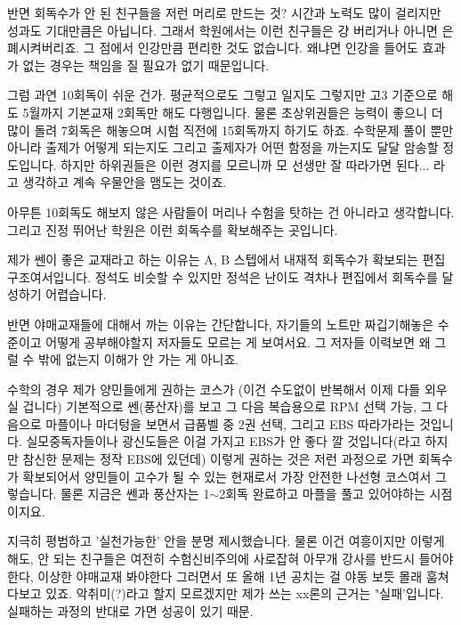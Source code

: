 반면 회독수가 안 된 친구들을 저런 머리로 만드는 것?
시간과 노력도 많이 걸리지만 성과도 기대만큼은 아닙니다. 그래서 학원에서는 이런 친구들은 걍 버리거나 아니면 은폐시켜버리죠.
그 점에서 인강만큼 편리한 것도 없습니다. 왜냐면 인강을 들어도 효과가 없는 경우는 책임을 질 필요가 없기 때문입니다.
\vspace{5mm}

그럼 과연 10회독이 쉬운 건가.
평균적으로도 그렇고 일지도 그렇지만 고3 기준으로 해도 5월까지 기본교재 2회독만 해도 다행입니다.
물론 초상위권들은 능력이 좋으니 더 많이 돌려 7회독은 해놓으며 시험 직전에 15회독까지 하기도 하죠.
수학문제 풀이 뿐만 아니라 출제가 어떻게 되는지도 그리고 출제자가 어떤 함정을 까는지도 달달 암송할 정도입니다.
하지만 하위권들은 이런 경지를 모르니까 모 선생만 잘 따라가면 된다... 라고 생각하고 계속 우물안을 맴도는 것이죠.
\vspace{5mm}

아무튼 10회독도 해보지 않은 사람들이 머리나 수험을 탓하는 건 아니라고 생각합니다.
그리고 진정 뛰어난 학원은 이런 회독수를 확보해주는 곳입니다.
\vspace{5mm}

제가 쎈이 좋은 교재라고 하는 이유는 A, B 스텝에서 내재적 회독수가 확보되는 편집구조여서입니다.
정석도 비슷할 수 있지만 정석은 난이도 격차나 편집에서 회독수를 달성하기 어렵습니다.
\vspace{5mm}

반면 야매교재들에 대해서 까는 이유는 간단합니다,
자기들의 노트만 짜깁기해놓은 수준이고 어떻게 공부해야할지 저자들도 모르는 게 보여서요.
그 저자들 이력보면 왜 그럴 수 밖에 없는지 이해가 안 가는 게 아니죠.
\vspace{5mm}

수학의 경우 제가 양민들에게 권하는 코스가 (이건 수도없이 반복해서 이제 다들 외우실 겁니다)
기본적으로 쎈(풍산자)를 보고 그 다음 복습용으로 RPM 선택 가능,
그 다음으로 마플이나 마더텅을 보면서 급품벨 중 2권 선택, 그리고 EBS 따라가라는 것입니다.
실모중독자들이나 광신도들은 이걸 가지고 EBS가 안 좋다 깔 것입니다(라고 하지만 참신한 문제는 정작 EBS에 있던데)
이렇게 권하는 것은 저런 과정으로 가면 회독수가 확보되어서 양민들이 고수가 될 수 있는 현재로서 가장 안전한 나선형 코스여서 그렇습니다.
물론 지금은 쎈과 풍산자는 1$\sim$2회독 완료하고 마플을 풀고 있어야하는 시점이지요.
\vspace{5mm}

지극히 평범하고 '실천가능한' 안을 분명 제시했습니다.
물론 이건 여흥이지만 이렇게 해도, 안 되는 친구들은 여전히 수험신비주의에 사로잡혀
아무개 강사를 반드시 들어야 한다, 이상한 야매교재 봐야한다 그러면서 또 올해 1년 공치는 걸 야동 보듯 몰래 훔쳐다보고 있죠.
악취미(?)라고 할지 모르겠지만 제가 쓰는 xx론의 근거는 "실패'입니다. 실패하는 과정의 반대로 가면 성공이 있기 때문.
\vspace{5mm}

